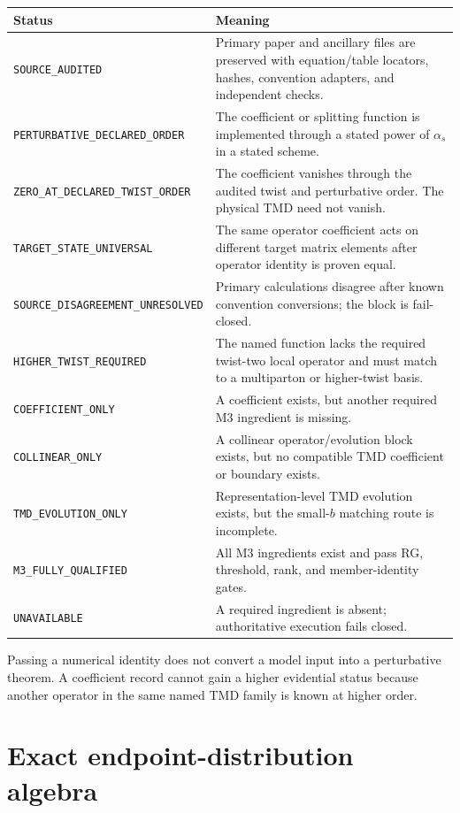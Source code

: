 \documentclass[11pt]{article}
\newcommand{\as}{\alpha_s}
\begin{document}
\begin{longtable}{L{0.26\textwidth}L{0.66\textwidth}}
\toprule
Status & Meaning\\
\midrule
\endhead
\texttt{SOURCE\_AUDITED} & Primary paper and ancillary files are preserved with equation/table locators, hashes, convention adapters, and independent checks.\\
\texttt{PERTURBATIVE\_\allowbreak DECLARED\_\allowbreak ORDER} & The coefficient or splitting function is implemented through a stated power of \(\as\) in a stated scheme.\\
\texttt{ZERO\_AT\_\allowbreak DECLARED\_\allowbreak TWIST\_\allowbreak ORDER} & The coefficient vanishes through the audited twist and perturbative order.  The physical TMD need not vanish.\\
\texttt{TARGET\_STATE\_\allowbreak UNIVERSAL} & The same operator coefficient acts on different target matrix elements after operator identity is proven equal.\\
\texttt{SOURCE\_\allowbreak DISAGREEMENT\_\allowbreak UNRESOLVED} & Primary calculations disagree after known convention conversions; the block is fail-closed.\\
\texttt{HIGHER\_TWIST\_\allowbreak REQUIRED} & The named function lacks the required twist-two local operator and must match to a multiparton or higher-twist basis.\\
\texttt{COEFFICIENT\_ONLY} & A coefficient exists, but another required M3 ingredient is missing.\\
\texttt{COLLINEAR\_ONLY} & A collinear operator/evolution block exists, but no compatible TMD coefficient or boundary exists.\\
\texttt{TMD\_EVOLUTION\_ONLY} & Representation-level TMD evolution exists, but the small-\(b\) matching route is incomplete.\\
\texttt{M3\_FULLY\_\allowbreak QUALIFIED} & All M3 ingredients exist and pass RG, threshold, rank, and member-identity gates.\\
\texttt{UNAVAILABLE} & A required ingredient is absent; authoritative execution fails closed.\\
\bottomrule
\end{longtable}

Passing a numerical identity does not convert a model input into a perturbative theorem.  A coefficient record cannot gain a higher evidential status because another operator in the same named TMD family is known at higher order.

\section{Exact endpoint-distribution algebra}
\label{sec:distributions}
\end{document}
